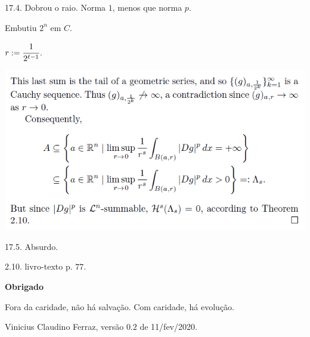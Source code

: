 \documentclass[12pt]{article}
\begin{document}
17.4. Dobrou o raio. Norma $1$, menos que norma $p$.

Embutiu $2^n$ em $C$.

$r := \cfrac{1}{2^{\ell-1}}$.

\vspace{300mm}

		\begin{center}
		\includegraphics{24}
		\end{center}

17.5. Absurdo.

2.10. livro-texto p. $77$.

\vspace{12mm}

\Large

\begin{center}
\textbf{Obrigado}
\end{center}

\large

\vspace{12mm}

Fora da caridade, n\~ao h\'a salva\c{c}\~ao. Com caridade, h\'a evolu\c{c}\~ao.

Vinicius Claudino Ferraz, vers\~ao $0.2$ de 11/fev/2020.
\end{document}

